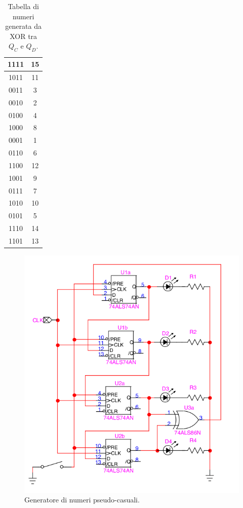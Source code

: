\documentclass[10pt,a4paper]{article}
\begin{document}
\begin{table}[!htb]
\centering
\begin{tabular}{|c|c|}
\hline 
1111 & 15 \\ 
\hline 
1011 & 11 \\ 
\hline 
0011 & 3 \\ 
\hline 
0010 & 2 \\ 
\hline 
0100 & 4 \\ 
\hline 
1000 & 8 \\ 
\hline 
0001 & 1 \\ 
\hline 
0110 & 6 \\ 
\hline 
1100 & 12 \\ 
\hline 
1001 & 9 \\ 
\hline 
0111 & 7 \\ 
\hline 
1010 & 10 \\ 
\hline 
0101 & 5 \\ 
\hline 
1110 & 14 \\ 
\hline 
1101 & 13 \\ 
\hline 
\end{tabular}
\caption{Tabella di numeri generata da XOR tra $Q_C$ e $Q_D$.\label{CD}} 
\end{table}

\begin{figure}[!htb]
\centering
\includegraphics[scale=0.5]{pseudi.png}
\caption{Generatore di numeri pseudo-casuali.\label{pseudo}}
\end{figure}
\end{document}
